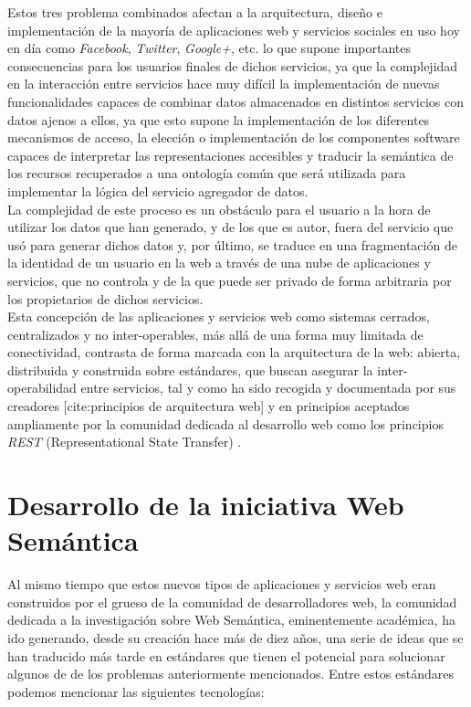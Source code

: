 Estos tres problema combinados afectan a la arquitectura, dise\~no e implementaci\'on de la mayor\'ia de aplicaciones web y servicios sociales en uso hoy en d\'ia como {\it Facebook}, {\it Twitter}, {\it Google+}, etc. lo que supone importantes consecuencias para los usuarios finales de dichos servicios, ya que la complejidad en la interacci\'on entre servicios hace muy dif\'icil la implementaci\'on de nuevas funcionalidades capaces de combinar datos almacenados en distintos servicios con datos ajenos a ellos, ya que esto supone la implementaci\'on de los diferentes mecanismos de acceso, la elecci\'on o implementaci\'on de los componentes software capaces de interpretar las representaciones accesibles y traducir la sem\'antica de los recursos recuperados a una ontolog\'ia com\'un que ser\'a utilizada para implementar la l\'ogica del servicio agregador de datos.\\
La complejidad de este proceso es un obst\'aculo para el usuario a la hora de utilizar los datos que han generado, y de los que es autor, fuera del servicio que us\'o para generar dichos datos y, por \'ultimo, se traduce en una fragmentaci\'on de la identidad de un usuario en la web a trav\'es de una nube de aplicaciones y servicios, que no controla y de la que puede ser privado de forma arbitraria por los propietarios de dichos servicios.\\
Esta concepci\'on de las aplicaciones y servicios web como sistemas cerrados, centralizados y no inter-operables, m\'as all\'a de una forma muy limitada de conectividad, contrasta de forma marcada con la arquitectura de la web: abierta, distribuida y construida sobre est\'andares, que buscan asegurar la inter-operabilidad entre servicios, tal y como ha sido recogida y documentada por sus creadores [cite:principios de arquitectura web] y en principios aceptados ampliamente por la comunidad dedicada al desarrollo web como los principios {\it REST} (Representational State Transfer) \cite{fielding2000representational}.\\

\section{Desarrollo de la iniciativa Web Sem\'antica}
Al mismo tiempo que estos nuevos tipos de aplicaciones y servicios web eran construidos por el grueso de la comunidad de desarrolladores web, la comunidad dedicada a la investigaci\'on sobre Web Sem\'antica, eminentemente acad\'emica, ha ido generando, desde su creaci\'on hace m\'as de diez a\~nos, una serie de ideas que se han traducido m\'as tarde en est\'andares que tienen el potencial para solucionar algunos de de los problemas anteriormente mencionados. Entre estos est\'andares podemos mencionar las siguientes tecnolog\'ias:

